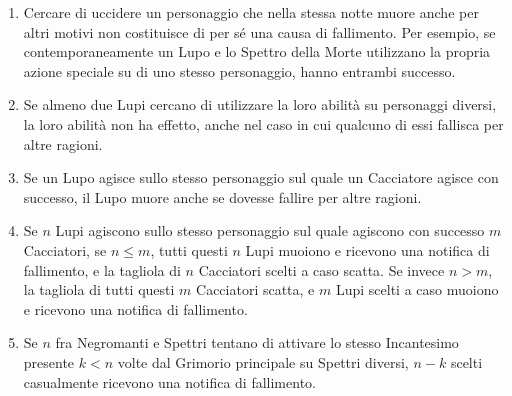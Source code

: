 \documentclass[a4paper,10pt]{article}
\begin{document}
\begin{enumerate}
	
	\item Cercare di uccidere un personaggio che nella stessa notte muore anche per altri motivi non costituisce di per sé una causa di fallimento.
	Per esempio, se contemporaneamente un Lupo e lo Spettro della Morte utilizzano la propria azione speciale su di uno stesso personaggio, hanno entrambi successo.
	
	\item Se almeno due Lupi cercano di utilizzare la loro abilità su personaggi diversi, la loro abilità non ha effetto, anche nel caso in cui qualcuno di essi fallisca per altre ragioni. 

	\item Se un Lupo agisce sullo stesso personaggio sul quale un Cacciatore agisce con successo, il Lupo muore anche se dovesse fallire per altre ragioni.

	\item Se $n$ Lupi agiscono sullo stesso personaggio sul quale agiscono con successo $m$ Cacciatori, se $n\le m$, tutti questi $n$ Lupi muoiono e ricevono una notifica di fallimento, e la tagliola di $n$ Cacciatori scelti a caso scatta.
	Se invece $n>m$, la tagliola di tutti questi $m$ Cacciatori scatta, e $m$ Lupi scelti a caso muoiono e ricevono una notifica di fallimento.
	
	
	
	\item Se $n$ fra Negromanti e Spettri tentano di attivare lo stesso Incantesimo presente $k<n$ volte dal Grimorio principale su Spettri diversi, $n-k$ scelti casualmente ricevono una notifica di fallimento.
	

\end{enumerate}
\end{document}
